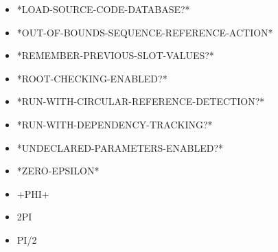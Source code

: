 \documentclass [11pt]{book}
\begin{document}
\begin{itemize}
\item {}*LOAD-SOURCE-CODE-DATABASE?*





\item {}*OUT-OF-BOUNDS-SEQUENCE-REFERENCE-ACTION*





\item {}*REMEMBER-PREVIOUS-SLOT-VALUES?*





\item {}*ROOT-CHECKING-ENABLED?*





\item {}*RUN-WITH-CIRCULAR-REFERENCE-DETECTION?*





\item {}*RUN-WITH-DEPENDENCY-TRACKING?*





\item {}*UNDECLARED-PARAMETERS-ENABLED?*





\item {}*ZERO-EPSILON*





\item {}+PHI+





\item {}2PI





\item {}PI/2





\end{itemize}
\end{document}
